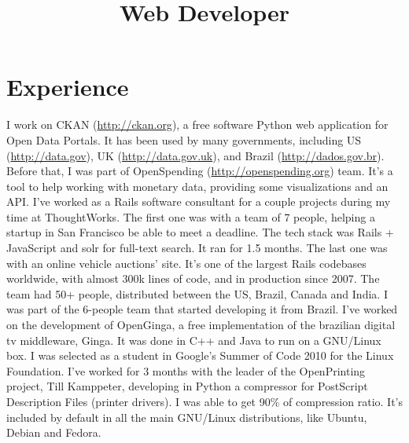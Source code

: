 \documentclass[11pt,a4paper]{moderncv}
\title{Web Developer}               %
\begin{document}
\maketitle


\section{Experience}
{
  I work on CKAN (\url{http://ckan.org}), a free software Python web application
  for Open Data Portals. It has been used by many governments, including
  US (\url{http://data.gov}), UK (\url{http://data.gov.uk}), and Brazil
  (\url{http://dados.gov.br}).
  Before that, I was part of OpenSpending (\url{http://openspending.org}) team.
  It's a tool to help working with monetary data, providing some visualizations
  and an API.
}
{
  I've worked as a Rails software consultant for a couple projects during my time
  at ThoughtWorks.
  The first one was with a team of 7 people, helping a startup in San Francisco
  be able to meet a deadline. The tech stack was Rails + JavaScript and solr for
  full-text search. It ran for 1.5 months.
  The last one was with an online vehicle auctions' site. It's one of the largest
  Rails codebases worldwide, with almost 300k lines of code, and in production
  since 2007. The team had 50+ people, distributed between the US, Brazil, Canada
  and India. I was part of the 6-people team that started developing it from
  Brazil.
}
{
  I've worked on the development of OpenGinga, a free implementation of the brazilian
  digital tv middleware, Ginga. It was done in C++ and Java to run on a GNU/Linux box.
}
{
  I was selected as a student in Google's Summer of Code 2010 for the Linux Foundation.
  I've worked for 3 months with the leader of the OpenPrinting project, Till Kamppeter,
  developing in Python a compressor for PostScript Description Files (printer drivers).
  I was able to get 90\% of compression ratio. It's included by default in all the main
  GNU/Linux distributions, like Ubuntu, Debian and Fedora.
}
\end{document}
